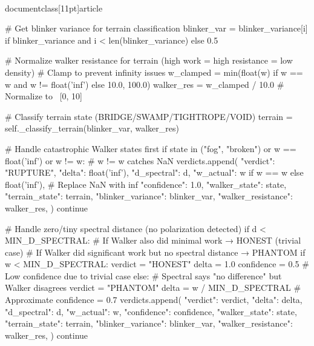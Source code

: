 \\documentclass[11pt]{article}
\begin{document}
\begin{CodeBlock}
            # Get blinker variance for terrain classification
            blinker_var = blinker_variance[i] if blinker_variance and i < len(blinker_variance) else 0.5

            # Normalize walker resistance for terrain (high work = high resistance = low density)
            # Clamp to prevent infinity issues
            w_clamped = min(float(w) if w == w and w != float('inf') else 10.0, 100.0)
            walker_res = w_clamped / 10.0  # Normalize to ~[0, 10]

            # Classify terrain state (BRIDGE/SWAMP/TIGHTROPE/VOID)
            terrain = self._classify_terrain(blinker_var, walker_res)

            # Handle catastrophic Walker states first
            if state in ("fog", "broken") or w == float('inf') or w != w:  # w != w catches NaN
                verdicts.append({
                    "verdict": "RUPTURE",
                    "delta": float('inf'),
                    "d_spectral": d,
                    "w_actual": w if w == w else float('inf'),  # Replace NaN with inf
                    "confidence": 1.0,
                    "walker_state": state,
                    "terrain_state": terrain,
                    "blinker_variance": blinker_var,
                    "walker_resistance": walker_res,
                })
                continue

            # Handle zero/tiny spectral distance (no polarization detected)
            if d < MIN_D_SPECTRAL:
                # If Walker also did minimal work → HONEST (trivial case)
                # If Walker did significant work but no spectral distance → PHANTOM
                if w < MIN_D_SPECTRAL:
                    verdict = "HONEST"
                    delta = 1.0
                    confidence = 0.5  # Low confidence due to trivial case
                else:
                    # Spectral says "no difference" but Walker disagrees
                    verdict = "PHANTOM"
                    delta = w / MIN_D_SPECTRAL  # Approximate
                    confidence = 0.7
                verdicts.append({
                    "verdict": verdict,
                    "delta": delta,
                    "d_spectral": d,
                    "w_actual": w,
                    "confidence": confidence,
                    "walker_state": state,
                    "terrain_state": terrain,
                    "blinker_variance": blinker_var,
                    "walker_resistance": walker_res,
                })
                continue


\end{CodeBlock}
\end{document}
